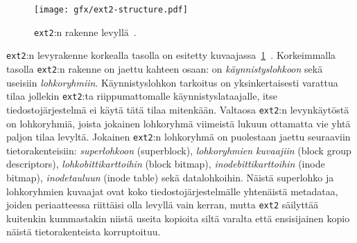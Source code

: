 \begin{figure}
    \label{FigExt2DiskFormat}
    \centering
    \texttt{[image: gfx/ext2-structure.pdf]}
    \caption{\texttt{ext2}:n rakenne levyllä~\cite{LinuxKernelBook}.}
\end{figure}

\texttt{ext2}:n levyrakenne korkealla tasolla on esitetty kuvaajassa~\ref{FigExt2DiskFormat}~\cite{LinuxKernelBook}.
Korkeimmalla tasolla \texttt{ext2}:n rakenne on jaettu kahteen osaan: on \emph{käynnistyslohkoon} sekä useisiin \emph{lohkoryhmiin}.
Käynnistyslohkon tarkoitus on yksinkertaisesti varattua tilaa jollekin \texttt{ext2}:ta riippumattomalle käynnistyslataajalle,
itse tiedostojärjestelmä ei käytä tätä tilaa mitenkään.
Valtaosa \texttt{ext2}:n levynkäytöstä on lohkoryhmiä,
joista jokainen lohkoryhmä viimeistä lukuun ottamatta vie yhtä paljon tilaa levyltä.
Jokainen \texttt{ext2}:n lohkoryhmä on puolestaan jaettu seuraaviin tietorakenteisiin:
\emph{superlohkoon} (superblock),
\emph{lohkoryhmien kuvaajiin} (block group descriptors),
\emph{lohkobittikarttoihin} (block bitmap),
\emph{inodebittikarttoihin} (inode bitmap),
\emph{inodetauluun} (inode table) sekä datalohkoihin.
Näistä superlohko ja lohkoryhmien kuvaajat ovat koko tiedostojärjestelmälle yhtenäistä metadataa,
joiden periaatteessa riittäisi olla levyllä vain kerran,
mutta \texttt{ext2} säilyttää kuitenkin kummastakin niistä useita kopioita siltä varalta että ensisijainen kopio näistä tietorakenteista korruptoituu.

